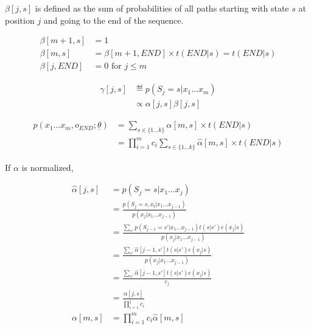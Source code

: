 $\beta[j, s]$ is defined as the sum of probabilities of all paths starting with 
state $s$ at position $j$ and going to the end of the sequence.

\begin{align}
\beta[m + 1, s] &= 1 \\
\beta[m, s] &= \beta[m + 1, END]\times t(END | s) = t(END | s) \\
\beta[j, END] &= 0 \text{ for } j \leq m
\end{align}

\begin{align}
\gamma[j, s]&\eqdef p(S_j = s | x_1\ldots x_m) \\
  &\propto \alpha[j, s]\beta[j, s]
\end{align}

\begin{align}
p(x_1\ldots x_m, o_{END}; \underline{\theta}) &= \sum_{s\in \{1\ldots k\}}\alpha[m, s]\times t(END|s) \\
    &= \prod_{i = 1}^m c_i \sum_{s\in \{1\ldots k\}}\hat{\alpha}[m, s]\times t(END|s)
\end{align}

If $\alpha$ is normalized, 

\begin{align}
\hat{\alpha}[j, s] &= p(S_j = s | x_1\ldots x_j) \\
    &= \frac{p(S_j = s, x_t | x_1\ldots x_{j-1})}{p(x_j|x_1\ldots x_{j - 1})} \\
    &= \frac{\sum_{s'} p(S_{j-1} = s'| x_1\ldots x_{j-1})t(s|s')e(x_j|s)}{p(x_j|x_1\ldots x_{j - 1})} \\
    &= \frac{\sum_{s'} \hat{\alpha}[j-1, s']t(s|s')e(x_j|s)}{p(x_j|x_1\ldots x_{j - 1})} \\
    &= \frac{\sum_{s'} \hat{\alpha}[j-1, s']t(s|s')e(x_j|s)}{c_j} \\
    & = \frac{\alpha[j, s]}{\prod_{i = 1}^j c_i} \\
\alpha[m, s] &= \prod_{i = 1}^m c_i \hat{\alpha}[m, s]
\end{align}

